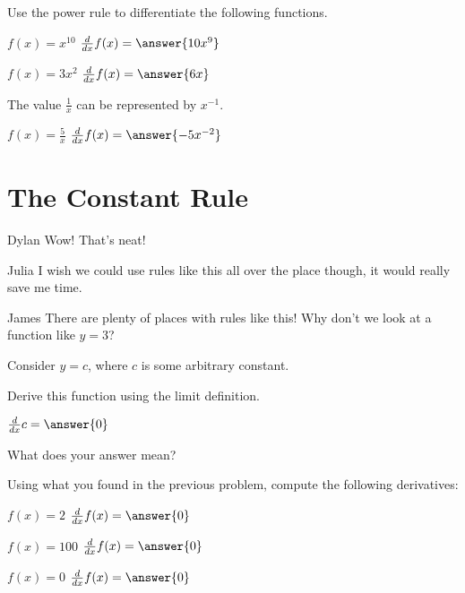 \documentclass{ximera}
\begin{document}
\begin{question}
Use the power rule to differentiate the following functions.

$f(x) = x^{10}$ \hspace{11mm} $\frac{d}{dx}f(x) = \answer{10x^9}$

$f(x) = 3x^2$ \hspace{10mm} $\frac{d}{dx}f(x) = \answer{6x}$

\begin{hint}
The value $\frac{1}{x}$ can be represented by $x^{-1}$.
\end{hint}
$f(x) = \frac{5}{x}$ \hspace{12mm} $\frac{d}{dx}f(x) = \answer{-5x^{-2}}$
\end{question}

\section{The Constant Rule}
\begin{dialogue}
\item[Dylan] Wow! That's neat!
\item[Julia] I wish we could use rules like this all over the place though, it would really save me time.
\item[James] There are plenty of places with rules like this! Why don't we look at a function like $y = 3$?
\end{dialogue}

Consider $y = c$, where $c$ is some arbitrary constant.
\begin{question}
Derive this function using the limit definition.

$ \frac{d}{dx} c =  \answer{0}$

What does your answer mean?
\begin{freeResponse}
\end{freeResponse}
\end{question}

\begin{question}
Using what you found in the previous problem, compute the following derivatives:

$f(x)=2$ \hspace{14mm} $\frac{d}{dx} f(x) =  \answer{0}$

$f(x)=100$ \hspace{10mm} $\frac{d}{dx} f(x) =  \answer{0}$

$f(x)=0$ \hspace{13mm} $\frac{d}{dx} f(x) =  \answer{0}$

\end{question}
\end{document}
